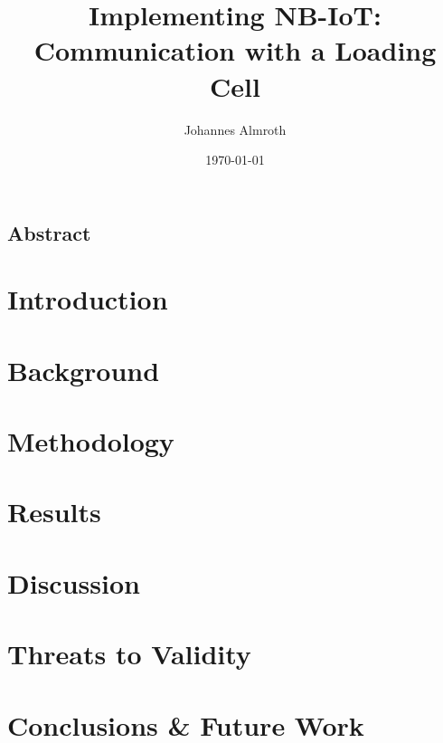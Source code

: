 \documentclass[11pt,titlepage,openright]{book}
\begin{document}
\frontmatter
\title{Implementing NB-IoT: Communication with a Loading Cell}
\author{Johannes Almroth}
\date{\today}

\maketitle

\vspace*{3cm}
\section*{Abstract}



\tableofcontents

\mainmatter

\chapter{Introduction}


\chapter{Background}


\chapter{Methodology}


\chapter{Results}


\chapter{Discussion}


\chapter{Threats to Validity}


\chapter{Conclusions \& Future Work}




\end{document}
